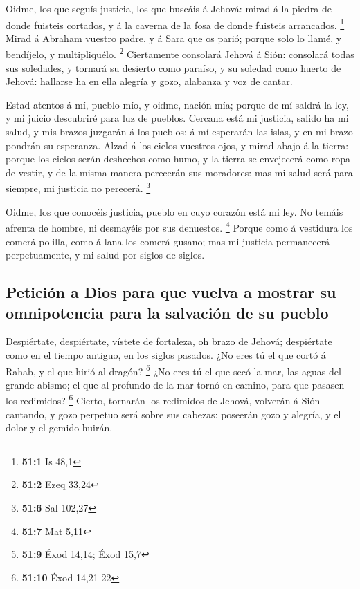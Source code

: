  Oidme, los que seguís justicia, los que buscáis á Jehová:
mirad á la piedra de donde fuisteis cortados, y á la caverna de la fosa
de donde fuisteis arrancados. \footnote{\textbf{51:1} Is 48,1}
 Mirad á Abraham vuestro padre, y á Sara que os parió;
porque solo lo llamé, y bendíjelo, y multipliquélo. \footnote{\textbf{51:2}
  Ezeq 33,24}  Ciertamente consolará Jehová á Sión:
consolará todas sus soledades, y tornará su desierto como paraíso, y su
soledad como huerto de Jehová: hallarse ha en ella alegría y gozo,
alabanza y voz de cantar.

 Estad atentos á mí, pueblo mío, y oidme, nación mía;
porque de mí saldrá la ley, y mi juicio descubriré para luz de pueblos.
 Cercana está mi justicia, salido ha mi salud, y mis
brazos juzgarán á los pueblos: á mí esperarán las islas, y en mi brazo
pondrán su esperanza.  Alzad á los cielos vuestros ojos, y
mirad abajo á la tierra: porque los cielos serán deshechos como humo, y
la tierra se envejecerá como ropa de vestir, y de la misma manera
perecerán sus moradores: mas mi salud será para siempre, mi justicia no
perecerá. \footnote{\textbf{51:6} Sal 102,27}

 Oidme, los que conocéis justicia, pueblo en cuyo corazón
está mi ley. No temáis afrenta de hombre, ni desmayéis por sus
denuestos. \footnote{\textbf{51:7} Mat 5,11}  Porque como
á vestidura los comerá polilla, como á lana los comerá gusano; mas mi
justicia permanecerá perpetuamente, y mi salud por siglos de siglos.

\hypertarget{peticiuxf3n-a-dios-para-que-vuelva-a-mostrar-su-omnipotencia-para-la-salvaciuxf3n-de-su-pueblo}{%
\subsection{Petición a Dios para que vuelva a mostrar su omnipotencia
para la salvación de su
pueblo}\label{peticiuxf3n-a-dios-para-que-vuelva-a-mostrar-su-omnipotencia-para-la-salvaciuxf3n-de-su-pueblo}}

 Despiértate, despiértate, vístete de fortaleza, oh brazo
de Jehová; despiértate como en el tiempo antiguo, en los siglos pasados.
¿No eres tú el que cortó á Rahab, y el que hirió al dragón? \footnote{\textbf{51:9}
  Éxod 14,14; Éxod 15,7}  ¿No eres tú el que secó la mar,
las aguas del grande abismo; el que al profundo de la mar tornó en
camino, para que pasasen los redimidos? \footnote{\textbf{51:10} Éxod
  14,21-22}  Cierto, tornarán los redimidos de Jehová,
volverán á Sión cantando, y gozo perpetuo será sobre sus cabezas:
poseerán gozo y alegría, y el dolor y el gemido huirán.

